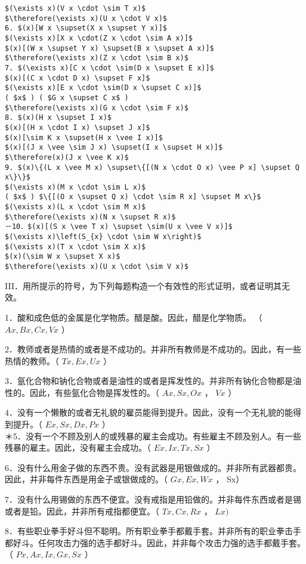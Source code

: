 \begin{verbatim}
$(\exists x)(V x \cdot \sim T x)$
$\therefore(\exists x)(U x \cdot V x)$
6. $(x)[W x \supset(X x \supset Y x)]$
$(\exists x)[X x \cdot(Z x \cdot \sim A x)]$
$(x)[(W x \supset Y x) \supset(B x \supset A x)]$
$\therefore(\exists x)(Z x \cdot \sim B x)$
7. $(\exists x)[C x \cdot \sim(D x \supset E x)]$
$(x)[(C x \cdot D x) \supset F x]$
$(\exists x)[E x \cdot \sim(D x \supset C x)]$
( $x$ ) ( $G x \supset C x$ )
$\therefore(\exists x)(G x \cdot \sim F x)$
8. $(x)(H x \supset I x)$
$(x)[(H x \cdot I x) \supset J x]$
$(x)[\sim K x \supset(H x \vee I x)]$
$(x)[(J x \vee \sim J x) \supset(I x \supset H x)]$
$\therefore(x)(J x \vee K x)$
9. $(x)\{(L x \vee M x) \supset\{[(N x \cdot O x) \vee P x] \supset Q x\}\}$
$(\exists x)(M x \cdot \sim L x)$
( $x$ ) $\{[(O x \supset Q x) \cdot \sim R x] \supset M x\}$
$(\exists x)(L x \cdot \sim M x)$
$\therefore(\exists x)(N x \supset R x)$
－10．$(x)[(S x \vee T x) \supset \sim(U x \vee V x)]$
$(\exists x)\left(S_{x} \cdot \sim W x\right)$
$(\exists x)(T x \cdot \sim X x)$
$(x)(\sim W x \supset X x)$
$\therefore(\exists x)(U x \cdot \sim V x)$
\end{verbatim}

III．用所提示的符号，为下列每题构造一个有效性的形式证明，或者证明其无效。

1．酸和成色低的金属是化学物质。醋是酸。因此，醋是化学物质。 （ $A x, B x, C x, V x$ ）

2．教师或者是热情的或者是不成功的。并非所有教师是不成功的。因此，有一些热情的教师。（ $T x, E x, U x$ ）

3．氩化合物和钠化合物或者是油性的或者是挥发性的。并非所有钠化合物都是油性的。因此，有些氩化合物是挥发性的。（ $A x, S x, O x$ ， $V x$ ）

4．没有一个懒散的或者无礼貌的雇员能得到提升。因此，没有一个无礼貌的能得到提升。（ $E x, S x, D x, P x$ ）\\
＊5．没有一个不顾及别人的或残暴的雇主会成功。有些雇主不顾及别人。有一些残暴的雇主。因此，没有雇主会成功。（ $E x, I x, T x, S x$ ）

6．没有什么用金子做的东西不贵。没有武器是用银做成的。并非所有武器都贵。因此，并非每件东西是用金子或银做成的。（ $G x, E x, W x$ ， Sx）

7．没有什么用锡做的东西不便宜。没有戒指是用铅做的。并非每件东西或者是锡或者是铅。因此，并非所有戒指都便宜。（ $T x, C x, R x$ ， $L x)$

8．有些职业拳手好斗但不聪明。所有职业拳手都戴手套。并非所有的职业拳击手都好斗。任何攻击力强的选手都好斗。因此，并非每个攻击力强的选手都戴手套。（ $P x, A x, I x, G x, S x$ ）

